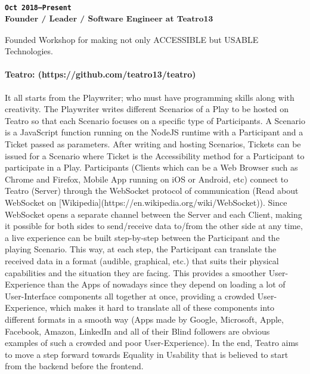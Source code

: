 \subsubsection{\textsubscript{\uppercase{\texttt{Oct 2018--Present}}\\
Founder / Leader / Software Engineer at Teatro13}}
Founded Workshop for making not only \uppercase{accessible} but \uppercase{usable} Technologies.
\paragraph{Teatro: (https://github.com/teatro13/teatro)}
It all starts from the Playwriter; who must have programming skills along with creativity.
The Playwriter writes different Scenarios of a Play to be hosted on Teatro so that each Scenario focuses on a specific type of Participants.
A Scenario is a JavaScript function running on the NodeJS runtime with a Participant and a Ticket passed as parameters.
After writing and hosting Scenarios, Tickets can be issued for a Scenario where Ticket is the Accessibility method for a Participant to participate in a Play.
Participants
(Clients which can be a Web Browser such as Chrome and Firefox, Mobile App running on iOS or Android, etc)
connect to Teatro (Server) through the WebSocket protocol of communication
(Read about WebSocket on [Wikipedia](https://en.wikipedia.org/wiki/WebSocket)).
Since WebSocket opens a separate channel between the Server and each Client, making it possible for both sides to send/receive data to/from the other side at any time,
a live experience can be built step-by-step between the Participant and the playing Scenario.
This way, at each step, the Participant can translate the received data in a format
(audible, graphical, etc.)
that suits their physical capabilities and the situation they are facing.
This provides a smoother User-Experience than the Apps of nowadays since they depend on loading a lot of User-Interface components all together at once,
providing a crowded User-Experience,
which makes it hard to translate all of these components into different formats in a smooth way
(Apps made by Google, Microsoft, Apple, Facebook, Amazon, LinkedIn and all of their Blind followers are obvious examples of such a crowded and poor User-Experience).
In the end, Teatro aims to move a step forward towards Equality in Usability that is believed to start from the backend before the frontend.
